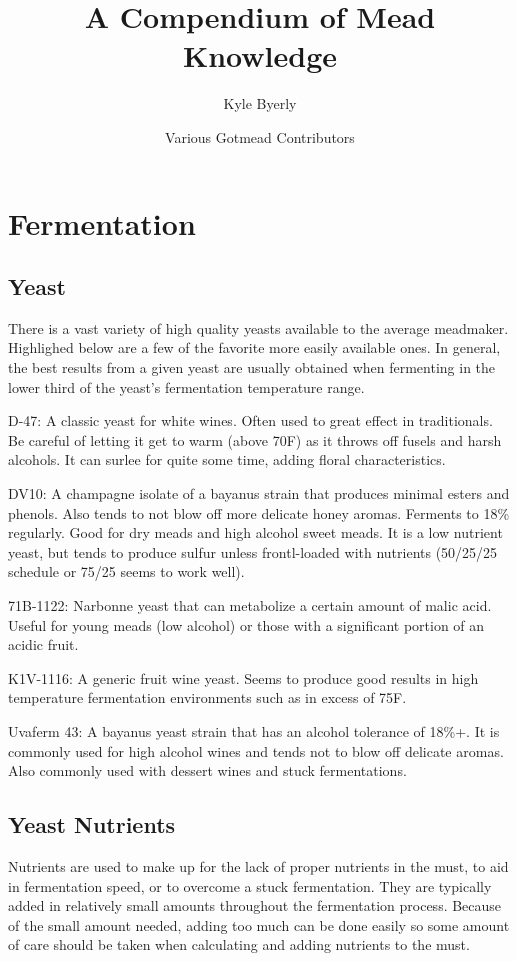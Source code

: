 \documentclass{article}
\title{A Compendium of Mead Knowledge}
\author{
  Kyle Byerly\\
 \and
  Various Gotmead Contributors\\
}
\begin{document}
\maketitle
\newpage

\tableofcontents
\newpage

\section{Fermentation}
 \subsection{Yeast}
  There is a vast variety of high quality yeasts available to the average meadmaker. Highlighed below are a few of the favorite more easily available ones. In general, the best results from a given yeast are usually obtained when fermenting in the lower third of the yeast's fermentation temperature range.

  D-47: A classic yeast for white wines. Often used to great effect in traditionals. Be careful of letting it get to warm (above 70F) as it throws off fusels and harsh alcohols. It can surlee for quite some time, adding floral characteristics.

  DV10: A champagne isolate of a bayanus strain that produces minimal esters and phenols. Also tends to not blow off more delicate honey aromas. Ferments to 18\% regularly. Good for dry meads and high alcohol sweet meads. It is a low nutrient yeast, but tends to produce sulfur unless frontl-loaded with nutrients (50/25/25 schedule or 75/25 seems to work well).

  71B-1122: Narbonne yeast that can metabolize a certain amount of malic acid. Useful for young meads (low alcohol) or those with a significant portion of an acidic fruit.

  K1V-1116: A generic fruit wine yeast. Seems to produce good results in high temperature fermentation environments such as in excess of 75F.

  Uvaferm 43: A bayanus yeast strain that has an alcohol tolerance of 18\%+. It is commonly used for high alcohol wines and tends not to blow off delicate aromas. Also commonly used with dessert wines and stuck fermentations. 

 \subsection{Yeast Nutrients}
  Nutrients are used to make up for the lack of proper nutrients in the must, to aid in fermentation speed, or to overcome a stuck fermentation. They are typically added in relatively small amounts throughout the fermentation process. Because of the small amount needed, adding too much can be done easily so some amount of care should be taken when calculating and adding nutrients to the must.
\end{document}
